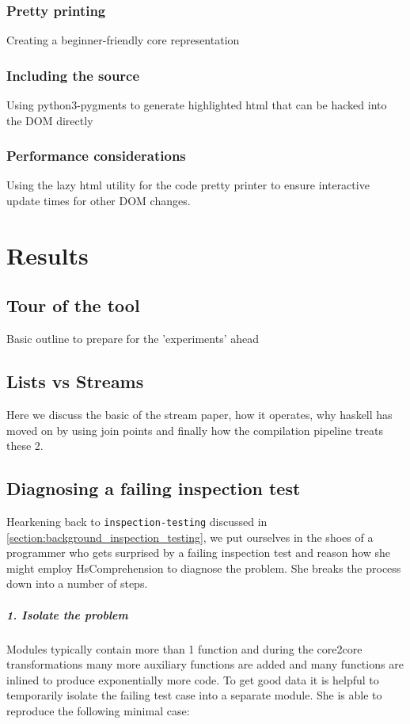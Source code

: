 \documentclass{report}
\newcommand{\mono}{\texttt}
\begin{document}
\subsection{Pretty printing}
Creating a beginner-friendly core representation

\subsection{Including the source}
Using python3-pygments to generate highlighted html that can be hacked into the DOM directly

\subsection{Performance considerations}
Using the lazy html utility for the code pretty printer to ensure interactive
update times for other DOM changes.

\chapter{Results}

\section{Tour of the tool}
Basic outline to prepare for the 'experiments' ahead

\section{Lists vs Streams}
Here we discuss the basic of the stream paper, how it operates, why haskell has moved on by using join points and
finally how the compilation pipeline treats these 2.

\section{Diagnosing a failing inspection test}

Hearkening back to \mono{inspection-testing} discussed in \cref{section:background_inspection_testing}, we put
ourselves in the shoes of a programmer who gets surprised by a failing inspection test and reason how she might
employ HsComprehension to diagnose the problem. She breaks the process down into a number of steps.

\paragraph{1. Isolate the problem}
Modules typically contain more than 1 function and during the core2core transformations many more auxiliary functions are
added and many functions are inlined to produce exponentially more code. To get good data it is helpful to temporarily isolate the
failing test case into a separate module. She is able to reproduce the following minimal case:
\end{document}
